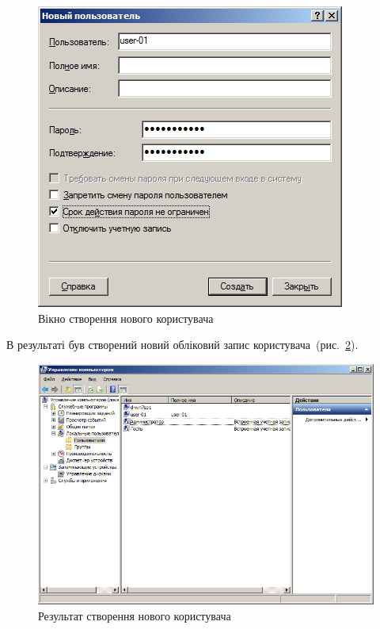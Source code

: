 \documentclass[
	a4paper,
	oneside,
	DIV = 12,
	fontsize = 13pt,
	headings = normal,
]{scrartcl}
\begin{document}
			\begin{figure}[!htbp]
				\centering
				\includegraphics[height = 9\baselineskip]{../01-solution/y03s01-pcdiag-lab-08-p02.png}
				\caption{Вікно створення нового користувача}
				\label{fig:user-account-creation-dialog}
			\end{figure}%

			В результаті був створений новий обліковий запис користувача~(рис.~\ref{fig:user-account-creation-result}).

			\begin{figure}[!htbp]
				\centering
				\includegraphics[height = 12\baselineskip]{../01-solution/y03s01-pcdiag-lab-08-p03.png}
				\caption{Результат створення нового користувача}
				\label{fig:user-account-creation-result}
			\end{figure}%
\end{document}
